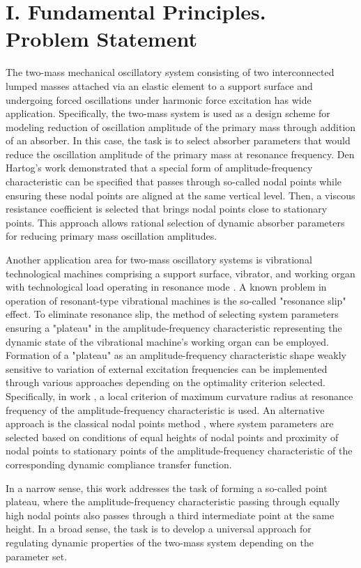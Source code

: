\documentclass[12pt, a4paper]{article}
\begin{document}
	\section*{I. Fundamental Principles. Problem Statement}
	The two-mass mechanical oscillatory system consisting of two interconnected lumped masses attached via an elastic element to a support surface and undergoing forced oscillations under harmonic force excitation has wide application. Specifically, the two-mass system is used as a design scheme for modeling reduction of oscillation amplitude of the primary mass through addition of an absorber. In this case, the task is to select absorber parameters that would reduce the oscillation amplitude of the primary mass at resonance frequency. Den Hartog's work \cite{DenHartog1956} demonstrated that a special form of amplitude-frequency characteristic can be specified that passes through so-called nodal points while ensuring these nodal points are aligned at the same vertical level. Then, a viscous resistance coefficient is selected that brings nodal points close to stationary points. This approach allows rational selection of dynamic absorber parameters for reducing primary mass oscillation amplitudes.
	
	Another application area for two-mass oscillatory systems is vibrational technological machines comprising a support surface, vibrator, and working organ with technological load operating in resonance mode \cite{Altschul2022}. A known problem in operation of resonant-type vibrational machines is the so-called "resonance slip" effect. To eliminate resonance slip, the method of selecting system parameters ensuring a "plateau" in the amplitude-frequency characteristic representing the dynamic state of the vibrational machine's working organ can be employed. Formation of a "plateau" as an amplitude-frequency characteristic shape weakly sensitive to variation of external excitation frequencies can be implemented through various approaches depending on the optimality criterion selected. Specifically, in work \cite{Eliseev2023}, a local criterion of maximum curvature radius at resonance frequency of the amplitude-frequency characteristic is used. An alternative approach is the classical nodal points method \cite{DenHartog1956}, where system parameters are selected based on conditions of equal heights of nodal points and proximity of nodal points to stationary points of the amplitude-frequency characteristic of the corresponding dynamic compliance transfer function. 
	
	In a narrow sense, this work addresses the task of forming a so-called point plateau, where the amplitude-frequency characteristic passing through equally high nodal points also passes through a third intermediate point at the same height. In a broad sense, the task is to develop a universal approach for regulating dynamic properties of the two-mass system depending on the parameter set.
	
\end{document}
